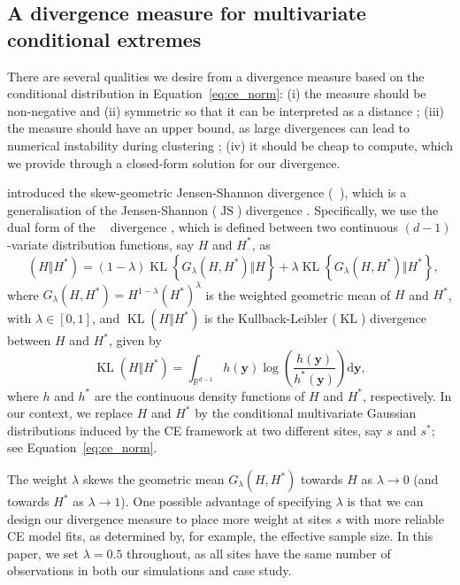 \documentclass[preprint,12pt,authoryear]{elsarticle}
\DeclareMathOperator{\KL}{KL}
\DeclareMathOperator{\JS}{JS}
\newcommand{\JSGa}{\mathop{\mathrm{JS}^{\mathrm{G}_{\lambda}}}\nolimits}
\begin{document}
\subsection{A divergence measure for multivariate conditional extremes}
\label{subsec:div}

There are several qualities we desire from a divergence measure based on the conditional distribution in Equation~\eqref{eq:ce_norm}:
(i) the measure should be non-negative and (ii) symmetric so that it can be interpreted as a distance \citep{Vijendra2015};
(iii) the measure should have an upper bound, as large divergences can lead to numerical instability during clustering \citep{Thiagarajan2025};
(iv) it should be cheap to compute, which we provide through a closed-form solution for our divergence. 

\citet{Nielsen2019} introduced the skew-geometric Jensen-Shannon divergence ($\JSGa{}$), which is a generalisation of the Jensen-Shannon ($\JS{}$) divergence \citep{Lin1991}. 
Specifically, we use the dual form of the $\JSGa{}$ divergence \citep{Deasy2020}, which is defined between two continuous $(d-1)$-variate distribution functions, say $H$ and $H^*$, as
\begin{equation}\label{eq:jsga}
  \JSGa{(H \Vert H^*)} = (1- \lambda) \KL{\left\{G_{\lambda}(H, H^*) \Vert H\right\}} + \lambda \KL{\left\{G_{\lambda}(H, H^*) \Vert H^*\right\}},
\end{equation}
where $G_{\lambda}(H, H^*) = H^{1-\lambda} {(H^*)}^{\lambda}$ is the weighted geometric mean of $H$ and $H^*$, with $\lambda \in [0, 1]$, and $\KL{(H \Vert H^*)}$ is the Kullback-Leibler ($\KL{}$) divergence between $H$ and $H^*$, given by 
\begin{equation}\label{eq:kl}
  \KL{(H \Vert H^*)} = \int_{\mathbb{R}^{d-1}} h(\boldsymbol{y}) \log\left(\frac{h(\boldsymbol{y})}{h^*(\boldsymbol{y})}\right) \mathrm{d}\boldsymbol{y},
\end{equation}
where $h$ and $h^*$ are the continuous density functions of $H$ and $H^*$, respectively. 
In our context, we replace $H$ and $H^*$ by the conditional multivariate Gaussian distributions induced by the CE framework at two different sites, say $s$ and $s^*$; see Equation~\eqref{eq:ce_norm}.

The weight $\lambda$ skews the geometric mean $G_{\lambda}(H,H^*)$ towards $H$ as $\lambda \to 0$ (and towards $H^*$ as $\lambda \to 1$).
One possible advantage of specifying $\lambda$ is that we can design our divergence measure to place more weight at sites $s$ with more reliable CE model fits, as determined by, for example, the effective sample size.
In this paper, we set $\lambda = 0.5$ throughout, as all sites have the same number of observations in both our simulations and case study.
\end{document}
